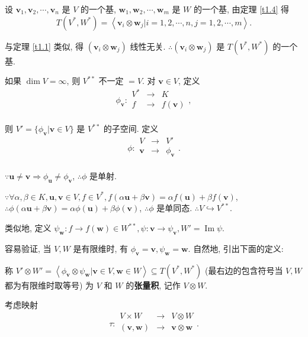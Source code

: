 \documentclass{ctexart}
\begin{document}
设 $\boldsymbol{v}_1,\boldsymbol{v}_2,\cdots,\boldsymbol{v}_n$ 是 $V$ 的一个基, $\boldsymbol{w}_1,\boldsymbol{w}_2,\cdots,\boldsymbol{w}_m$ 是 $W$ 的一个基, 由定理 \ref{t1.4} 得
\[T(V^*,W^*)=\left<\boldsymbol{v}_i\otimes\boldsymbol{w}_j|i=1,2,\cdots,n,j=1,2,\cdots,m\right>.\]

与定理 \ref{t1.1} 类似, 得 $(\boldsymbol{v}_i\otimes\boldsymbol{w}_j)$ 线性无关. $\therefore(\boldsymbol{v}_i\otimes\boldsymbol{w}_j)$ 是 $T(V^*,W^*)$ 的一个基.

如果 $\dim V=\infty$, 则 $V^{**}$ 不一定 $=V$. 对 $\boldsymbol{v}\in V$, 定义
\[\phi_{\boldsymbol{v}}:\begin{array}{rcl}
    V^* & \to & K \\
    f & \to & f(\boldsymbol{v}) \\
\end{array},\]

则 $V'=\{\phi_{\boldsymbol{v}}|\boldsymbol{v}\in V\}$ 是 $V^{**}$ 的子空间. 定义
\[\phi:\begin{array}{rcl}
    V & \to & V' \\
    \boldsymbol{v} & \to & \phi_{\boldsymbol{v}} \\
\end{array}.\]

$\because\boldsymbol{u}\neq\boldsymbol{v}\Rightarrow\phi_{\boldsymbol{u}}\neq\phi_{\boldsymbol{v}}$, $\therefore\phi$ 是单射.

$\because\forall\alpha,\beta\in K,\boldsymbol{u},\boldsymbol{v}\in V,f\in V^*,f(\alpha\boldsymbol{u}+\beta\boldsymbol{v})=\alpha f(\boldsymbol{u})+\beta f(\boldsymbol{v})$, $\therefore\phi(\alpha\boldsymbol{u}+\beta\boldsymbol{v})=\alpha\phi(\boldsymbol{u})+\beta\phi(\boldsymbol{v})$, $\therefore\phi$ 是单同态. $\therefore V\hookrightarrow V^{**}$.

类似地, 定义 $\psi_{\boldsymbol{w}}:f\to f(\boldsymbol{w})\in W^{**},\psi:\boldsymbol{v}\to\psi_{\boldsymbol{v}},W'=\operatorname{Im}\psi$.

容易验证, 当 $V,W$ 是有限维时, 有 $\phi_{\boldsymbol{v}}=\boldsymbol{v},\psi_{\boldsymbol{w}}=\boldsymbol{w}$. 自然地, 引出下面的定义:
\begin{definition}\label{d1.2}
    称 $V'\otimes W'=\left<\phi_{\boldsymbol{v}}\otimes\psi_{\boldsymbol{w}}|\boldsymbol{v}\in V,\boldsymbol{w}\in W\right>\subseteq T(V^*,W^*)$ (最右边的包含符号当 $V,W$ 都为有限维时取等号) 为 $V$ 和 $W$ 的\textbf{张量积}, 记作 $V\otimes W$.
\end{definition}
考虑映射
\[\tau:\begin{array}{rcl}
    V\times W & \to & V\otimes W \\
    (\boldsymbol{v},\boldsymbol{w}) & \to & \boldsymbol{v}\otimes\boldsymbol{w} \\
\end{array}.\]
\end{document}
